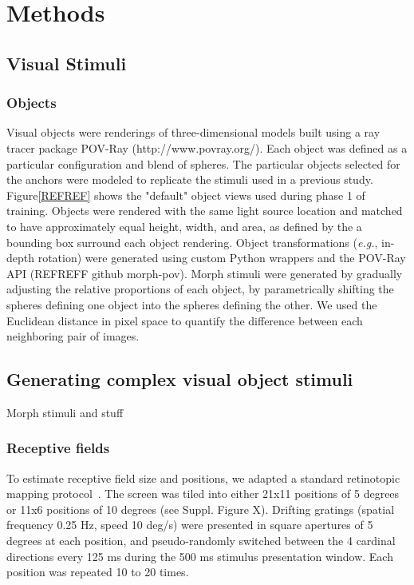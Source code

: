 \chapter{Methods}
\label{methods}


\section{Visual Stimuli}
\subsection{Objects}
Visual objects were renderings of three-dimensional models built using a ray tracer package POV-Ray (http://www.povray.org/). Each object was defined as a particular configuration and blend of spheres. The particular objects selected for the anchors were modeled to replicate the stimuli used in a previous study\cite{Zoccolan2009}. Figure\ref{REFREF} shows the "default" object views used during phase 1 of training. Objects were rendered with the same light source location and matched to have approximately equal height, width, and area, as defined by the a bounding box surround each object rendering. Object transformations (\textit{e.g.}, in-depth rotation) were generated using custom Python wrappers and the POV-Ray API (REFREFF github morph-pov). 
Morph stimuli were generated by gradually adjusting the relative proportions of each object, by parametrically shifting the spheres defining one object into the spheres defining the other. We used the Euclidean distance in pixel space to quantify the difference between each neighboring pair of images. 


\section{Generating complex visual object stimuli}
Morph stimuli and stuff


\subsection{Receptive fields}
To estimate receptive field size and positions, we adapted a standard retinotopic mapping protocol~\cite{petreanuRF}. The screen was tiled into either 21x11 positions of 5 degrees or 11x6 positions of 10 degrees (see Suppl. Figure X). Drifting gratings (spatial frequency 0.25 Hz, speed 10 deg/s) were presented in square apertures of 5 degrees at each position, and pseudo-randomly switched between the 4 cardinal directions every 125 ms during the 500 ms stimulus presentation window. Each position was repeated 10 to 20 times. 

